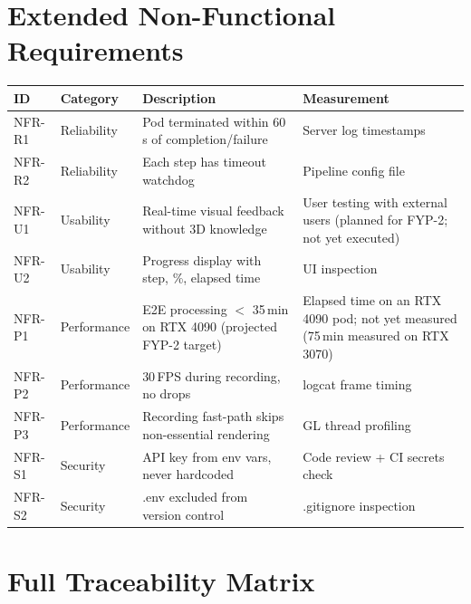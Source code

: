 \section{Extended Non-Functional Requirements}

\begin{longtable}{p{}p{}p{}p{}}
\toprule
\textbf{ID} & \textbf{Category} & \textbf{Description} & \textbf{Measurement} \\
\midrule
NFR-R1 & Reliability & Pod terminated within 60\,s of completion/failure & Server log timestamps \\
NFR-R2 & Reliability & Each step has timeout watchdog & Pipeline config file \\
NFR-U1 & Usability & Real-time visual feedback without 3D knowledge & User testing with external users (planned for FYP-2; not yet executed) \\
NFR-U2 & Usability & Progress display with step, \%, elapsed time & UI inspection \\
NFR-P1 & Performance & E2E processing $<$ 35\,min on RTX 4090 (projected FYP-2 target) & Elapsed time on an RTX 4090 pod; not yet measured (75\,min measured on RTX 3070) \\
NFR-P2 & Performance & 30\,FPS during recording, no drops & logcat frame timing \\
NFR-P3 & Performance & Recording fast-path skips non-essential rendering & GL thread profiling \\
NFR-S1 & Security & API key from env vars, never hardcoded & Code review + CI secrets check \\
NFR-S2 & Security & .env excluded from version control & .gitignore inspection \\
\bottomrule
\end{longtable}

\section{Full Traceability Matrix}

